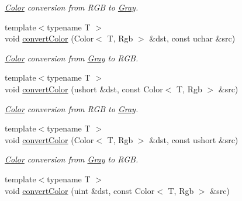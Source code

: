 \begin{DoxyCompactItemize}
\begin{DoxyCompactList}\small\item\em \hyperlink{class_d_o_1_1_color}{Color} conversion from R\-G\-B to \hyperlink{struct_d_o_1_1_gray}{Gray}. \end{DoxyCompactList}\item 
\hypertarget{group___color_conversion_gafc8d94b34860d29067fe9b242c900f6b}{{\footnotesize template$<$typename T $>$ }\\void \hyperlink{group___color_conversion_gafc8d94b34860d29067fe9b242c900f6b}{convert\-Color} (Color$<$ T, Rgb $>$ \&dst, const uchar \&src)}\label{group___color_conversion_gafc8d94b34860d29067fe9b242c900f6b}

\begin{DoxyCompactList}\small\item\em \hyperlink{class_d_o_1_1_color}{Color} conversion from \hyperlink{struct_d_o_1_1_gray}{Gray} to R\-G\-B. \end{DoxyCompactList}\item 
\hypertarget{group___color_conversion_gaab2e1b8480e491b35c672164f52065a1}{{\footnotesize template$<$typename T $>$ }\\void \hyperlink{group___color_conversion_gaab2e1b8480e491b35c672164f52065a1}{convert\-Color} (ushort \&dst, const Color$<$ T, Rgb $>$ \&src)}\label{group___color_conversion_gaab2e1b8480e491b35c672164f52065a1}

\begin{DoxyCompactList}\small\item\em \hyperlink{class_d_o_1_1_color}{Color} conversion from R\-G\-B to \hyperlink{struct_d_o_1_1_gray}{Gray}. \end{DoxyCompactList}\item 
\hypertarget{group___color_conversion_ga51ae8a0b4207c11c6e21329dba4f6777}{{\footnotesize template$<$typename T $>$ }\\void \hyperlink{group___color_conversion_ga51ae8a0b4207c11c6e21329dba4f6777}{convert\-Color} (Color$<$ T, Rgb $>$ \&dst, const ushort \&src)}\label{group___color_conversion_ga51ae8a0b4207c11c6e21329dba4f6777}

\begin{DoxyCompactList}\small\item\em \hyperlink{class_d_o_1_1_color}{Color} conversion from \hyperlink{struct_d_o_1_1_gray}{Gray} to R\-G\-B. \end{DoxyCompactList}\item 
\hypertarget{group___color_conversion_ga9bc400410f4ce0c92b283158b49f0deb}{{\footnotesize template$<$typename T $>$ }\\void \hyperlink{group___color_conversion_ga9bc400410f4ce0c92b283158b49f0deb}{convert\-Color} (uint \&dst, const Color$<$ T, Rgb $>$ \&src)}\label{group___color_conversion_ga9bc400410f4ce0c92b283158b49f0deb}


\end{DoxyCompactItemize}
